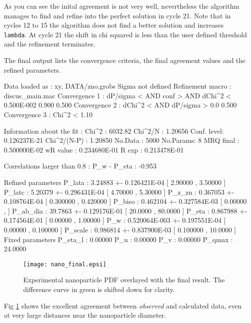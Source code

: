 As you can see the inital agreement is not very well, nevertheless the algorithm 
manages to find and refine into the perfect solution in cycle 21. Note that in 
cycles 12 to 15 the algorithm does not find a better solution and increases 
{\tt lambda}. At cycle 21 the shift in chi squared is less than the user defined 
threshold and the refinement terminates.

The final output lists the convergence criteria, the final agreement values
and the refined parameters.

\begin{MacVerbatim}
 Data loaded as     : xy, DATA/zno.grobs
 Sigma not defined  
 Refinement macro   : discus_main.mac
   Convergence 1    : dP/sigma < AND conf >     AND dChi^2 <
                      0.500E-002     0.900          0.500     
   Convergence 2    : dChi^2 <   AND dP/sigma > 0.0          
                      0.500     
   Convergence 3    : Chi^2 <                                
                       1.10     

 Information about the fit : 
   Chi^2      :  6032.82          Chi^2/N :  1.20656    
   Conf. level: 0.126237E-21  Chi^2/(N-P) :  1.20850    
   No.Data    :         5000     No.Params:            8
   MRQ final  : 0.500000E-02
   wR value   : 0.234680E-01      R exp   : 0.213478E-01

 Correlations larger than 0.8 :
   P_w              - P_eta            : -0.953
  
 Refined parameters
   P_lata           :    3.24883      +-    0.126421E-04    [   2.90000     ,   3.50000     ]
   P_latc           :    5.20379      +-    0.296431E-04    [   4.70000     ,   5.30000     ]
   P_z_zn           :   0.367053      +-    0.108764E-04    [  0.300000     ,  0.420000     ]
   P_biso           :   0.462104      +-    0.327584E-03    [   0.00000     ,               ]
   P_ab_dia         :    39.7863      +-    0.129176E-01    [   20.0000     ,   80.0000     ]
   P_eta            :   0.867988      +-    0.174564E-01    [   0.00000     ,   1.00000     ]
   P_w              :   0.520064E-003 +-    0.197551E-04    [   0.00000     ,  0.100000     ]
   P_scale          :   0.986814      +-    0.837900E-03    [  0.100000     ,   10.0000     ]
 Fixed   parameters
   P_eta_l          :    0.00000     
   P_u              :    0.00000     
   P_v              :    0.00000     
   P_qmax           :    24.0000     
\end{MacVerbatim}

\begin{figure}
   \texttt{[image: nano\_final.epsi]}
   \caption{Experimental nanoparticle PDF overlayed with the final result.
   The difference curve in green is shifted down for clarity.
   }
   \label{fexa-nano-fin}
\end{figure}

Fig \ref{fexa-nano-fin} shows the excellent agreement between {\it observed} and 
calculated data, even at very large distances near the nanoparticle 
diameter. 

